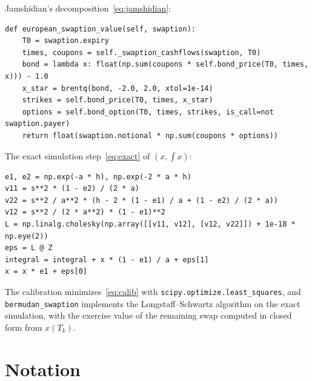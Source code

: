 \documentclass[11pt,a4paper]{article}
\theoremstyle{plain}
\theoremstyle{definition}
\begin{document}
Jamshidian's decomposition~\eqref{eq:jamshidian}:
\begin{lstlisting}[style=pystyle]
def european_swaption_value(self, swaption):
    T0 = swaption.expiry
    times, coupons = self._swaption_cashflows(swaption, T0)
    bond = lambda x: float(np.sum(coupons * self.bond_price(T0, times, x))) - 1.0
    x_star = brentq(bond, -2.0, 2.0, xtol=1e-14)
    strikes = self.bond_price(T0, times, x_star)
    options = self.bond_option(T0, times, strikes, is_call=not swaption.payer)
    return float(swaption.notional * np.sum(coupons * options))
\end{lstlisting}

The exact simulation step~\eqref{eq:exact} of $(x,\int x)$:
\begin{lstlisting}[style=pystyle]
e1, e2 = np.exp(-a * h), np.exp(-2 * a * h)
v11 = s**2 * (1 - e2) / (2 * a)
v22 = s**2 / a**2 * (h - 2 * (1 - e1) / a + (1 - e2) / (2 * a))
v12 = s**2 / (2 * a**2) * (1 - e1)**2
L = np.linalg.cholesky(np.array([[v11, v12], [v12, v22]]) + 1e-18 * np.eye(2))
eps = L @ Z
integral = integral + x * (1 - e1) / a + eps[1]
x = x * e1 + eps[0]
\end{lstlisting}

The calibration minimizes~\eqref{eq:calib} with \texttt{scipy.optimize.least\_squares}, and \texttt{bermudan\_swaption} implements the Longstaff--Schwartz algorithm on the exact simulation, with the exercise value of the remaining swap computed in closed form from $x(T_k)$.

\clearpage
\section{Notation}
\label{app:notation}
\end{document}
